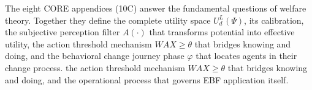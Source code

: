 \begin{tcolorbox}[colback=red!5!white, colframe=red!75!black,
    title=The CORE Appendices: Foundation of EBF]

The eight CORE appendices (10C) answer the fundamental questions of welfare theory.
Together they define the complete utility space $U^L_d(\Psi)$, its calibration, the
subjective perception filter $A(\cdot)$ that transforms potential into effective utility,
the action threshold mechanism $WAX \geq \theta$ that bridges knowing and doing,
and the behavioral change journey phase $\varphi$ that locates agents in their change process.
the action threshold mechanism $WAX \geq \theta$ that bridges knowing and doing, and
the operational process that governs EBF application itself.

\begin{center}
\begin{tikzpicture}[node distance=2.5cm]
\end{tikzpicture}
\end{center}

\end{tcolorbox}

